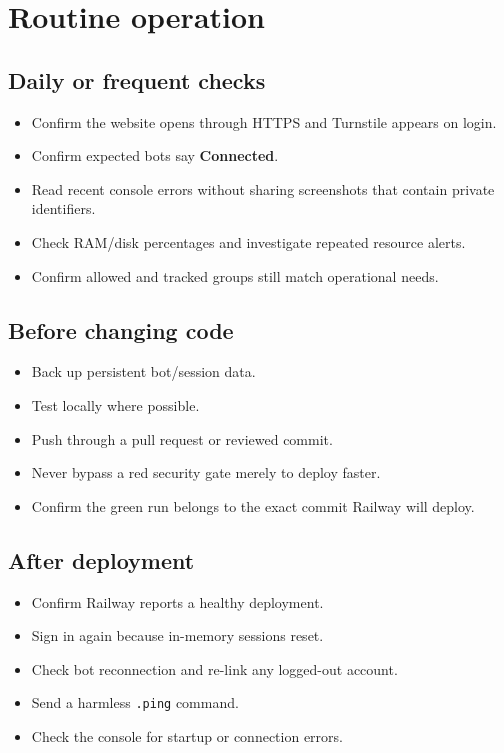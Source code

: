 \documentclass[11pt,a4paper]{article}
\begin{document}
\section{Routine operation}

\subsection{Daily or frequent checks}

\begin{itemize}
  \item Confirm the website opens through HTTPS and Turnstile appears on login.
  \item Confirm expected bots say \textbf{Connected}.
  \item Read recent console errors without sharing screenshots that contain private identifiers.
  \item Check RAM/disk percentages and investigate repeated resource alerts.
  \item Confirm allowed and tracked groups still match operational needs.
\end{itemize}

\subsection{Before changing code}

\begin{itemize}
  \item Back up persistent bot/session data.
  \item Test locally where possible.
  \item Push through a pull request or reviewed commit.
  \item Never bypass a red security gate merely to deploy faster.
  \item Confirm the green run belongs to the exact commit Railway will deploy.
\end{itemize}

\subsection{After deployment}

\begin{itemize}
  \item Confirm Railway reports a healthy deployment.
  \item Sign in again because in-memory sessions reset.
  \item Check bot reconnection and re-link any logged-out account.
  \item Send a harmless \texttt{.ping} command.
  \item Check the console for startup or connection errors.
\end{itemize}
\end{document}
